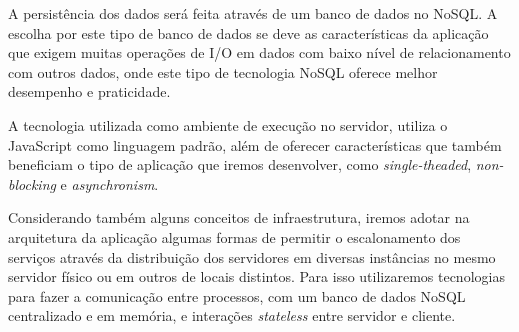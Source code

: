 A persistência dos dados será feita através de um banco de dados no NoSQL. A escolha por este tipo de banco de dados se deve as características da aplicação que exigem muitas operações de I/O em dados com baixo nível de relacionamento com outros dados, onde este tipo de tecnologia NoSQL oferece melhor desempenho e praticidade.

A tecnologia utilizada como ambiente de execução no servidor, utiliza o JavaScript como linguagem padrão, além de oferecer características que também beneficiam o tipo de aplicação que iremos desenvolver, como \textit{single-theaded}, \textit{non-blocking} e \textit{asynchronism}. 

Considerando também alguns conceitos de infraestrutura, iremos adotar na arquitetura da aplicação algumas formas de permitir o escalonamento dos serviços através da distribuição dos servidores em diversas instâncias no mesmo servidor físico ou em outros de locais distintos. Para isso utilizaremos tecnologias para fazer a comunicação entre processos, com um banco de dados NoSQL centralizado e em memória, e interações \textit{stateless} entre servidor e cliente.
